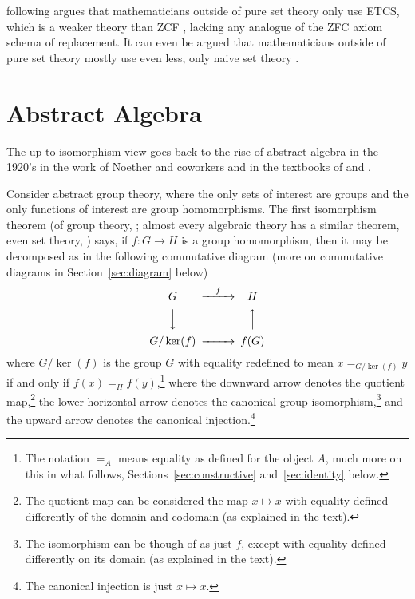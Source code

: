 \documentclass[11pt]{article}
\begin{document}
\citet{leinster} following \citet{lawvere-etcs} argues that mathematicians
outside of pure set theory \citep[the subject of][]{jech} only use ETCS,
which is a weaker theory than ZCF
\citep[Section~``How strong are the axioms?'']{leinster}, lacking any analogue
of the ZFC axiom schema of replacement.
It can even be argued that mathematicians outside of pure set theory mostly
use even less, only naive set theory \citep{halmos}.

\section{Abstract Algebra}
\label{sec:abstract-algebra}

The up-to-isomorphism view goes back to the rise of abstract algebra in
the 1920's in the work of Noether and coworkers
\citep[Chapter~6]{kleiner} and in the textbooks of
\citet{van-der-waerden} and \citet{birkhoff-maclane}.

Consider abstract group theory, where the only sets of interest are groups
and the only functions of interest are group homomorphisms.
The first isomorphism theorem (of group theory,
\citealp[Theorem~II.8.1]{aluffi};
almost every algebraic theory has a similar theorem, even set theory,
\citealp[Theorem~I.2.7]{aluffi})
says, if $f : G \to H$ is a group homomorphism,
then it may be decomposed as in the following commutative diagram
(more on commutative diagrams in Section~\ref{sec:diagram} below)
\begin{equation} \label{diag:isomorphism}
\begin{CD}
   G @>f>> H \\
   @VVV   @AAA \\
   G / \ker(f) @>>> f(G)
\end{CD}
\end{equation}
where $G / \ker(f)$ is the group $G$ with equality redefined to mean
$x =_{G / \ker(f)} y$ if and only if $f(x) =_H f(y)$,\footnote{The
notation $=_A$ means equality as defined for the object $A$, much
more on this in what follows, Sections~\ref{sec:constructive}
and~\ref{sec:identity} below.}
where the downward arrow denotes the quotient map,\footnote{The
quotient map can be considered the map $x \mapsto x$ with equality
defined differently of the domain and codomain (as explained in the text).}
the lower horizontal arrow denotes the canonical group
isomorphism,\footnote{The isomorphism can be though of as just $f$,
except with equality defined differently on its domain
(as explained in the text).}
and the upward arrow denotes the canonical injection.\footnote{The
canonical injection is just $x \mapsto x$.}
\end{document}
